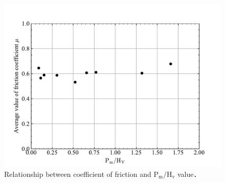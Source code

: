 \begin{table}[htbp]
    \centering
    \caption{Theoretical contact area, average contact pressure, $\mathrm{P_m/H_v}$ value and static contact morphology(R=8[mm]).}
    \label{tbl:平均圧力8mm}
\end{table}

\begin{figure}[htbp]
    \centering %
    \includegraphics[width=100truemm,clip]{fig/fig_PmHv.pdf}
    \caption{Relationship between coefficient of friction and $\mathrm{P_m/H_v}$ value．}
    \label{fig:fig_Pm}
\end{figure}

